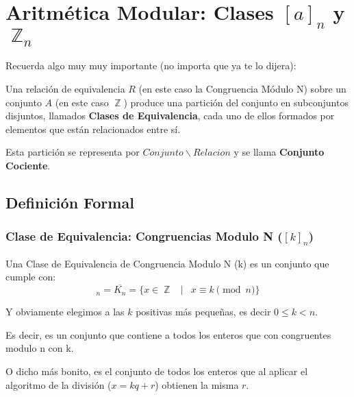\documentclass[12pt, fleqn]{report}                             %
\DeclareMathOperator \Space {\quad}                             %
\DeclareMathOperator \MiniSpace {\;}                            %
\newcommand \Such {\MiniSpace|\MiniSpace}                       %
\DeclareMathOperator \Integers  {\mathbb{Z}}                     %
\begin{document}
    \clearpage
    \section{Aritmética Modular: Clases $[a]_n$ y $\Integers_n$}

        Recuerda algo muy muy importante (no importa que ya te lo dijera):

        Una relación de equivalencia $R$ (en este caso la Congruencia Módulo N)
        sobre un conjunto $A$ (en este caso $\Integers$) produce una partición
        del conjunto en subconjuntos disjuntos, llamados \textbf{Clases de
        Equivalencia}, cada uno de ellos formados por elementos que están
        relacionados entre sí.

        Esta partición se representa por $Conjunto \backslash Relacion$ y se llama
        \textbf{Conjunto Cociente}.


        \subsection*{Definición Formal}

            \subsubsection*{Clase de Equivalencia: Congruencias Modulo N ($[k]_n$)}

                Una Clase de Equivalencia de Congruencia Modulo N (k) es un conjunto
                que cumple con:
                \begin{equation}
                    [k]_n = \overline{K_n} = \{ x \in \Integers \Such x \equiv k \pmod{n} \}
                \end{equation}

                Y obviamente elegimos a las $k$ positivas más pequeñas, es decir 
                $0 \leq k < n$.

                Es decir, es un conjunto que contiene a todos los enteros que con
                congruentes modulo n con k.

                O dicho más bonito, es el conjunto de todos los enteros que al aplicar
                el algoritmo de la división ($x = kq+r$) obtienen la misma $r$.\\
\end{document}
